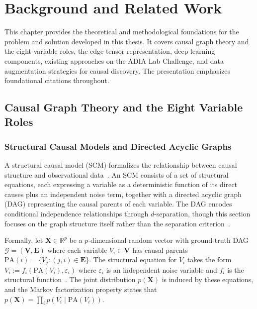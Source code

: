 \chapter{Background and Related Work}
\label{chap:background}

This chapter provides the theoretical and methodological foundations for the problem and solution developed in this thesis. It covers causal graph theory and the eight variable roles, the edge tensor representation, deep learning components, existing approaches on the ADIA Lab Challenge, and data augmentation strategies for causal discovery. The presentation emphasizes foundational citations throughout.

\section{Causal Graph Theory and the Eight Variable Roles}
\label{sec:causal_graph}

\subsection{Structural Causal Models and Directed Acyclic Graphs}
\label{sec:scm_dag}

A structural causal model (SCM) formalizes the relationship between causal structure and observational data~\cite{pearl2009causality, spirtes2000causation}. An SCM consists of a set of structural equations, each expressing a variable as a deterministic function of its direct causes plus an independent noise term, together with a directed acyclic graph (DAG) representing the causal parents of each variable. The DAG encodes conditional independence relationships through $d$-separation, though this section focuses on the graph structure itself rather than the separation criterion~\cite{geiger2013dseparation}.

Formally, let $\mathbf{X}\in\mathbb{R}^p$ be a $p$-dimensional random vector with ground-truth DAG $\mathcal{G}=(\mathbf{V},\mathbf{E})$ where each variable $V_i\in\mathbf{V}$ has causal parents $\mathrm{PA}(i)=\{V_j:(j,i)\in\mathbf{E}\}$. The structural equation for $V_i$ takes the form $V_i := f_i(\mathrm{PA}(V_i), \varepsilon_i)$ where $\varepsilon_i$ is an independent noise variable and $f_i$ is the structural function~\cite{peters2017elements}. The joint distribution $p(\mathbf{X})$ is induced by these equations, and the Markov factorization property states that $p(\mathbf{X})=\prod_i p(V_i\mid\mathrm{PA}(V_i))$.

